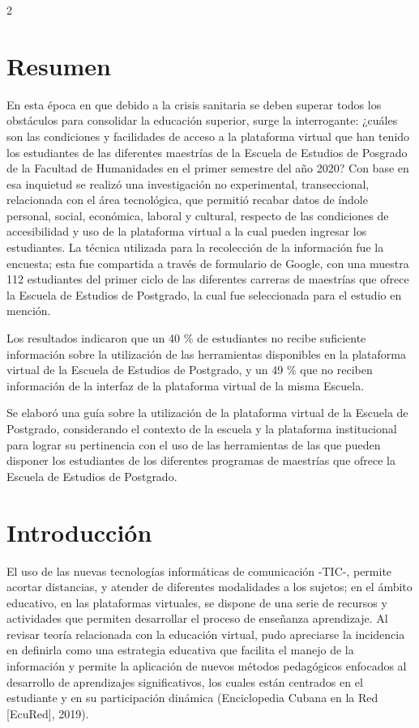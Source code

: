 \documentclass[12pt,spanish,Letterpaper,openany]{book}
\begin{document}
\begin {multicols}{2}

\hypertarget{resumen-2}{%
\section{Resumen}\label{resumen-2}}

En esta época en que debido a la crisis sanitaria se deben superar todos los obstáculos para consolidar la educación superior, surge la interrogante: ¿cuáles son las condiciones y facilidades de acceso a la plataforma virtual que han tenido los estudiantes de las diferentes maestrías de la Escuela de Estudios de Posgrado de la Facultad de Humanidades en el primer semestre del año 2020? Con base en esa inquietud se realizó una investigación no experimental, transeccional, relacionada con el área tecnológica, que permitió recabar datos de índole personal, social, económica, laboral y cultural, respecto de las condiciones de accesibilidad y uso de la plataforma virtual a la cual pueden ingresar los estudiantes. La técnica utilizada para la recolección de la información fue la encuesta; esta fue compartida a través de formulario de Google, con una muestra 112 estudiantes del primer ciclo de las diferentes carreras de maestrías que ofrece la Escuela de Estudios de Postgrado, la cual fue seleccionada para el estudio en mención.

Los resultados indicaron que un 40 \% de estudiantes no recibe suficiente información sobre la utilización de las herramientas disponibles en la plataforma virtual de la Escuela de Estudios de Postgrado, y un 49 \% que no reciben información de la interfaz de la plataforma virtual de la misma Escuela.

Se elaboró una guía sobre la utilización de la plataforma virtual de la Escuela de Postgrado, considerando el contexto de la escuela y la plataforma institucional para lograr su pertinencia con el uso de las herramientas de las que pueden disponer los estudiantes de los diferentes programas de maestrías que ofrece la Escuela de Estudios de Postgrado.

\hypertarget{introducciuxf3n-3}{%
\section{Introducción}\label{introducciuxf3n-3}}

El uso de las nuevas tecnologías informáticas de comunicación -TIC-, permite acortar distancias,
y atender de diferentes modalidades a los sujetos; en el ámbito educativo, en las plataformas
virtuales, se dispone de una serie de recursos y actividades que permiten desarrollar el proceso
de enseñanza aprendizaje. Al revisar teoría relacionada con la educación virtual, pudo apreciarse
la incidencia en definirla como una estrategia educativa que facilita el manejo de la información
y permite la aplicación de nuevos métodos pedagógicos enfocados al desarrollo de aprendizajes
significativos, los cuales están centrados en el estudiante y en su participación dinámica
(Enciclopedia Cubana en la Red {[}EcuRed{]}, 2019).


\end{multicols}
\end{document}

